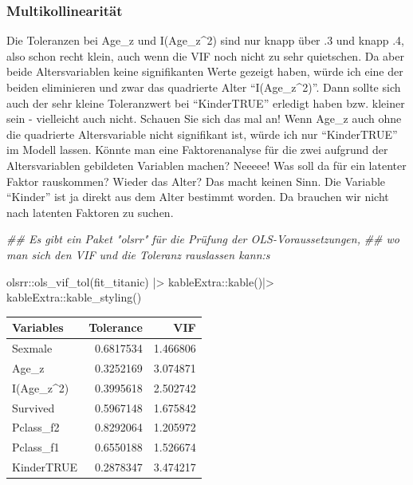 \documentclass[
  10pt,
  letterpaper,
  a4paper, twoside]{scrreprt}
\newenvironment{Shaded}{\begin{snugshade}}{\end{snugshade}}
\newcommand{\DocumentationTok}[1]{\textcolor[rgb]{0.37,0.37,0.37}{\textit{#1}}}
\newcommand{\FunctionTok}[1]{\textcolor[rgb]{0.28,0.35,0.67}{#1}}
\newcommand{\NormalTok}[1]{\textcolor[rgb]{0.00,0.23,0.31}{#1}}
\newcommand{\SpecialCharTok}[1]{\textcolor[rgb]{0.37,0.37,0.37}{#1}}
\begin{document}
\subsubsection{Multikollinearität}\label{multikollinearituxe4t}

Die Toleranzen bei Age\_z und I(Age\_z\^{}2) sind nur knapp über .3 und
knapp .4, also schon recht klein, auch wenn die VIF noch nicht zu sehr
quietschen. Da aber beide Altersvariablen keine signifikanten Werte
gezeigt haben, würde ich eine der beiden eliminieren und zwar das
quadrierte Alter \enquote{I(Age\_z\^{}2)}. Dann sollte sich auch der
sehr kleine Toleranzwert bei \enquote{KinderTRUE} erledigt haben bzw.
kleiner sein - vielleicht auch nicht. Schauen Sie sich das mal an! Wenn
Age\_z auch ohne die quadrierte Altersvariable nicht signifikant ist,
würde ich nur \enquote{KinderTRUE} im Modell lassen. Könnte man eine
Faktorenanalyse für die zwei aufgrund der Altersvariablen gebildeten
Variablen machen? Neeeee! Was soll da für ein latenter Faktor
rauskommen? Wieder das Alter? Das macht keinen Sinn. Die Variable
\enquote{Kinder} ist ja direkt aus dem Alter bestimmt worden. Da
brauchen wir nicht nach latenten Faktoren zu suchen.

\begin{Shaded}
\begin{Highlighting}[]

\DocumentationTok{\#\# Es gibt ein Paket "olsrr" für die Prüfung der OLS{-}Voraussetzungen, }
\DocumentationTok{\#\# wo man sich den VIF und die Toleranz rauslassen kann:s}

\NormalTok{olsrr}\SpecialCharTok{::}\FunctionTok{ols\_vif\_tol}\NormalTok{(fit\_titanic) }\SpecialCharTok{|\textgreater{}}
\NormalTok{  kableExtra}\SpecialCharTok{::}\FunctionTok{kable}\NormalTok{()}\SpecialCharTok{|\textgreater{}}
\NormalTok{  kableExtra}\SpecialCharTok{::}\FunctionTok{kable\_styling}\NormalTok{()}
\end{Highlighting}
\end{Shaded}

\begin{table}
\centering
\begin{tabular}{l|r|r}
\hline
Variables & Tolerance & VIF\\
\hline
Sexmale & 0.6817534 & 1.466806\\
\hline
Age\_z & 0.3252169 & 3.074871\\
\hline
I(Age\_z\textasciicircum{}2) & 0.3995618 & 2.502742\\
\hline
Survived & 0.5967148 & 1.675842\\
\hline
Pclass\_f2 & 0.8292064 & 1.205972\\
\hline
Pclass\_f1 & 0.6550188 & 1.526674\\
\hline
KinderTRUE & 0.2878347 & 3.474217\\
\hline
\end{tabular}
\end{table}
\end{document}
